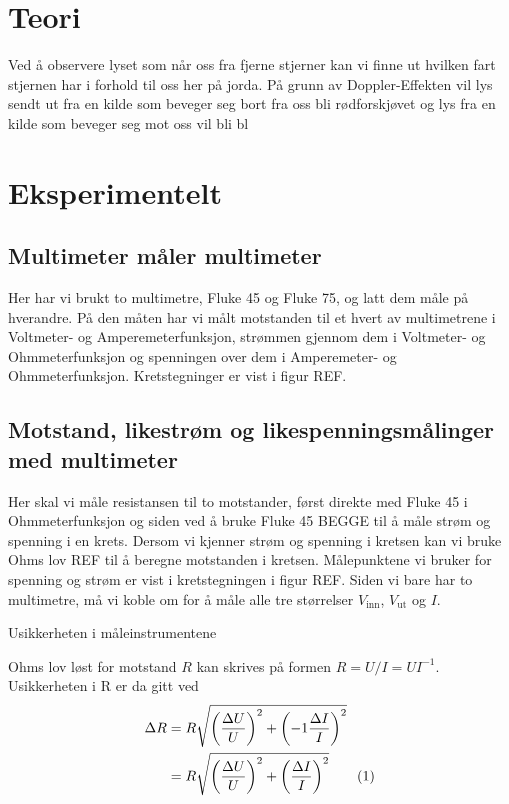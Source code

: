 \documentclass[reprint, english,notitlepage]{revtex4-1}  %
\newcommand\numberthis{\addtocounter{equation}{1}\tag{\theequation}}
\begin{document}
\section{Teori}

Ved å observere lyset som når oss fra fjerne stjerner kan vi finne ut hvilken fart stjernen har i
 forhold til oss her på jorda. På grunn av Doppler-Effekten vil lys sendt ut fra en kilde som
 beveger seg bort fra oss bli rødforskjøvet og lys fra en kilde som beveger seg mot oss vil bli
 bl



\section{Eksperimentelt}
\subsection{Multimeter måler multimeter}
Her har vi brukt to multimetre, Fluke 45 og Fluke 75, og latt dem måle på hverandre. På den måten har vi målt motstanden til et hvert av multimetrene i Voltmeter- og Amperemeterfunksjon, strømmen gjennom dem i Voltmeter- og Ohmmeterfunksjon og spenningen over dem i Amperemeter- og Ohmmeterfunksjon. Kretstegninger er vist i figur REF.

\subsection{Motstand, likestrøm og likespenningsmålinger med multimeter}
Her skal vi måle resistansen til to motstander, først direkte med Fluke 45 i Ohmmeterfunksjon og siden ved å bruke Fluke 45 BEGGE til å måle strøm og spenning i en krets. Dersom vi kjenner strøm og spenning i kretsen kan vi bruke Ohms lov REF til å beregne motstanden i kretsen. Målepunktene vi bruker for spenning og strøm er vist i kretstegningen i figur REF. Siden vi bare har to multimetre, må vi koble om for å måle alle tre størrelser $V_{\text{inn}}$, $V_{\text{ut}}$ og $I$.

Usikkerheten i måleinstrumentene

Ohms lov løst for motstand $R$ kan skrives på formen $R = U/I = U I^{-1}$. Usikkerheten i R er da gitt ved
\begin{align*}
  \Delta R &= R \sqrt{\left( \frac{\Delta U}{U} \right) ^2 + \left( -1 \frac{\Delta I}{I} \right) ^2} \\
  &= R \sqrt{\left( \frac{\Delta U}{U} \right) ^2 + \left( \frac{\Delta I}{I} \right) ^2} \numberthis \label{eq:usikkerhet_R}
\end{align*}
\end{document}
